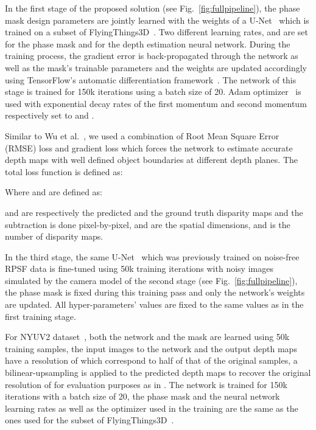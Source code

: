 \documentclass[preprint,5p,twocolumn]{elsarticle}
\begin{document}
In the first stage of the proposed solution (see Fig.~\ref{fig:fullpipeline}), the phase mask design parameters  are jointly learned with the weights of a U-Net~\cite{ronneberger2015u} which is trained on a subset of FlyingThings3D~\cite{MIFDB16}. Two different learning rates,  and  are set for the phase mask and for the depth estimation neural network. During the training process, the gradient error is back-propagated through the network as well as the mask's trainable parameters and the weights are updated accordingly using TensorFlow's automatic differentiation framework~\cite{tensorflow2015-whitepaper}. The network of this stage is trained for 150k iterations using a batch size of 20. Adam optimizer~\cite{kingma2014adam} is used with exponential decay rates of the first momentum and second momentum respectively set to  and . 

Similar to Wu et al.~\cite{wu2019phasecam3d}, we used a combination of Root Mean Square Error (RMSE) loss  and gradient loss  which forces the network to estimate accurate depth maps with well defined object boundaries at different depth planes. The total loss function is defined as:



Where  and  are defined as:





 and  are respectively the predicted and the ground truth disparity maps and the subtraction is done pixel-by-pixel,  and  are the spatial dimensions, and  is the number of disparity maps.

In the third stage, the same U-Net~\cite{ronneberger2015u} which was previously trained on noise-free RPSF data is fine-tuned using 50k training iterations with noisy images simulated by the camera model of the second stage (see Fig.~\ref{fig:fullpipeline}), the phase mask is fixed during this training pass and only the network's weights are updated. All hyper-parameters' values are fixed to the same values as in the first training stage.

For NYUV2 dataset~\cite{eigen2014depth}, both the network and the mask are learned  using 50k training samples, the input images to the network and the output depth maps have a resolution of  which correspond to half of that of the original samples, a bilinear-upsampling is applied to the predicted depth maps to recover the original resolution of  for evaluation purposes as in \cite{bhat2020adabins, chen2019structure,hao2018detail}. The network is trained for 150k iterations with a batch size of 20, the phase mask and  the neural network learning rates as well as the optimizer used in the training are the same as the ones used for the subset of FlyingThings3D~\cite{MIFDB16}.
\end{document}
